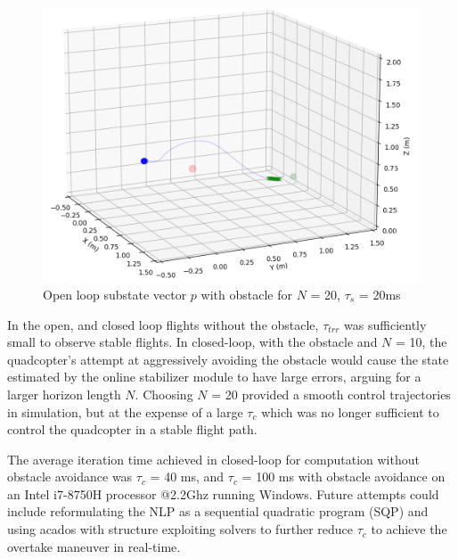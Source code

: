 \documentclass[conference]{IEEEtran}
\begin{document}
\begin{figure}[htbp]
	\centerline{\includegraphics[scale = 0.4]{figures/Screenshot_OLwO_ST.png} }
	\caption{Open loop substate vector $p$ with obstacle for $N$ = 20, $\tau_s$ = 20ms}
	\label{Fig4}
\end{figure} 

In the open, and closed loop flights without the obstacle, $\tau_{trr}$ was sufficiently small to observe stable flights. In closed-loop, with the obstacle and $N$ = 10, the quadcopter's attempt at aggressively avoiding the obstacle would cause the state estimated by the online stabilizer module to have large errors, arguing for a larger horizon length $N$. Choosing $N$ = 20 provided a smooth control trajectories in simulation, but at the expense of a large $\tau_{c}$ which was no longer sufficient to control the quadcopter in a stable flight path. 


The average iteration time achieved in closed-loop for computation without obstacle avoidance was $\tau_{c}$ = 40 ms, and $\tau_{c}$ = 100 ms with obstacle avoidance on an Intel i7-8750H processor @2.2Ghz running Windows. Future attempts could include reformulating the NLP as a sequential quadratic program (SQP) and using acados \cite{verschueren_acados_2020} with structure exploiting solvers to further reduce $\tau_c$ to achieve the overtake maneuver in real-time.
\end{document}
